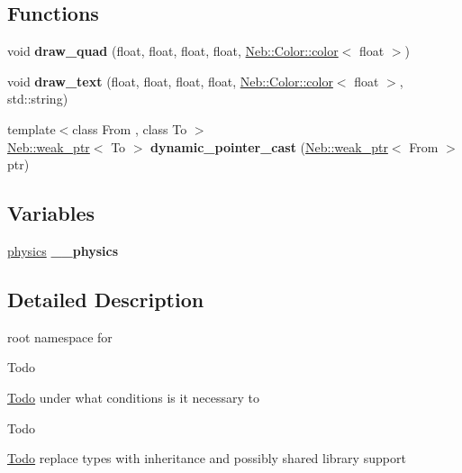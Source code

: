 \subsection*{\-Functions}
\begin{DoxyCompactItemize}
\item 
\hypertarget{namespaceNeb_a8ebdfeffa1def13492f72074015c2876}{void {\bfseries draw\-\_\-quad} (float, float, float, float, \hyperlink{classNeb_1_1Color_1_1color}{\-Neb\-::\-Color\-::color}$<$ float $>$)}\label{namespaceNeb_a8ebdfeffa1def13492f72074015c2876}

\item 
\hypertarget{namespaceNeb_a7daf427c7b6f28a6da236451dc42f6d1}{void {\bfseries draw\-\_\-text} (float, float, float, float, \hyperlink{classNeb_1_1Color_1_1color}{\-Neb\-::\-Color\-::color}$<$ float $>$, std\-::string)}\label{namespaceNeb_a7daf427c7b6f28a6da236451dc42f6d1}

\item 
\hypertarget{namespaceNeb_a4ed152a7fe9e22a11580d60f1d14b2d2}{{\footnotesize template$<$class From , class To $>$ }\\\hyperlink{classNeb_1_1weak__ptr}{\-Neb\-::weak\-\_\-ptr}$<$ \-To $>$ {\bfseries dynamic\-\_\-pointer\-\_\-cast} (\hyperlink{classNeb_1_1weak__ptr}{\-Neb\-::weak\-\_\-ptr}$<$ \-From $>$ ptr)}\label{namespaceNeb_a4ed152a7fe9e22a11580d60f1d14b2d2}

\end{DoxyCompactItemize}
\subsection*{\-Variables}
\begin{DoxyCompactItemize}
\item 
\hypertarget{namespaceNeb_a16bff826fe3b967c09a5f37850d60ee5}{\hyperlink{classNeb_1_1physics}{physics} {\bfseries \-\_\-\-\_\-physics}}\label{namespaceNeb_a16bff826fe3b967c09a5f37850d60ee5}

\end{DoxyCompactItemize}


\subsection{\-Detailed \-Description}
root namespace for  \begin{DoxyRefDesc}{\-Todo}
\item[\hyperlink{todo__todo000008}{\-Todo}]under what conditions is it necessary to \end{DoxyRefDesc}


\begin{DoxyRefDesc}{\-Todo}
\item[\hyperlink{todo__todo000017}{\-Todo}]replace types with inheritance and possibly shared library support \end{DoxyRefDesc}
